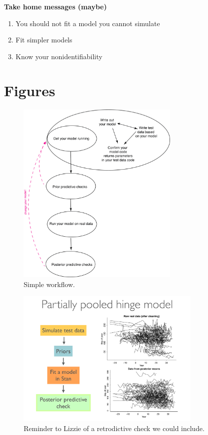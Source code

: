 \documentclass[11pt]{article}
\begin{document}

{\bf Take home messages (maybe)}
\begin{enumerate}
\item You should not fit a model you cannot simulate
\item Fit simpler models
\item Know your nonidentifiability
\end{enumerate}

\newpage
\section{Figures}

\begin{figure}[ht]
\centering
\noindent \includegraphics[width=0.7\textwidth]{figures/workflow.png}
\caption{Simple workflow.}
\label{fig:workflow}
\end{figure}

\begin{figure}[ht]
\centering
\noindent \includegraphics[width=0.8\textwidth]{figures/Pages_from_generablestannyc.pdf}
\caption{Reminder to Lizzie of a retrodictive check we could include.}
\label{fig:retrodictivecheck}
\end{figure}
\end{document}
